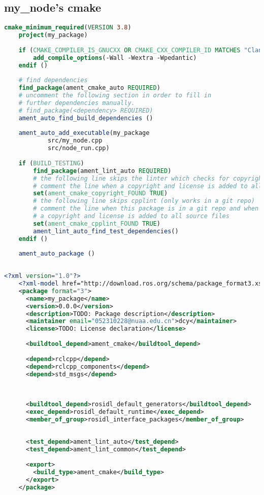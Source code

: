 
\subsection{my\_node's cmake}

\begin{lstlisting}[language=cmake,label=lst:ament_cmake_auto_config,caption=my\_node's cmake]
    cmake_minimum_required(VERSION 3.8)
    project(my_package)
    
    if (CMAKE_COMPILER_IS_GNUCXX OR CMAKE_CXX_COMPILER_ID MATCHES "Clang")
        add_compile_options(-Wall -Wextra -Wpedantic)
    endif ()
    
    # find dependencies
    find_package(ament_cmake_auto REQUIRED)
    # uncomment the following section in order to fill in
    # further dependencies manually.
    # find_package(<dependency> REQUIRED)
    ament_auto_find_build_dependencies ()
    
    ament_auto_add_executable(my_package
            src/my_node.cpp
            src/node_run.cpp)
    
    if (BUILD_TESTING)
        find_package(ament_lint_auto REQUIRED)
        # the following line skips the linter which checks for copyrights
        # comment the line when a copyright and license is added to all source files
        set(ament_cmake_copyright_FOUND TRUE)
        # the following line skips cpplint (only works in a git repo)
        # comment the line when this package is in a git repo and when
        # a copyright and license is added to all source files
        set(ament_cmake_cpplint_FOUND TRUE)
        ament_lint_auto_find_test_dependencies()
    endif ()
    
    ament_auto_package ()
    
\end{lstlisting}


\begin{lstlisting}[language=XML,label=lst:xml_1,caption=my\_node's xml]
    <?xml version="1.0"?>
    <?xml-model href="http://download.ros.org/schema/package_format3.xsd" schematypens="http://www.w3.org/2001/XMLSchema"?>
    <package format="3">
      <name>my_package</name>
      <version>0.0.0</version>
      <description>TODO: Package description</description>
      <maintainer email="052310228@nuaa.edu.cn">dcy</maintainer>
      <license>TODO: License declaration</license>
    
      <buildtool_depend>ament_cmake</buildtool_depend>
    
      <depend>rclcpp</depend>
      <depend>rclcpp_components</depend>
      <depend>std_msgs</depend>
    
    
    
      <buildtool_depend>rosidl_default_generators</buildtool_depend>
      <exec_depend>rosidl_default_runtime</exec_depend>
      <member_of_group>rosidl_interface_packages</member_of_group>
    
    
      <test_depend>ament_lint_auto</test_depend>
      <test_depend>ament_lint_common</test_depend>
    
      <export>
        <build_type>ament_cmake</build_type>
      </export>
    </package>
    
\end{lstlisting}

